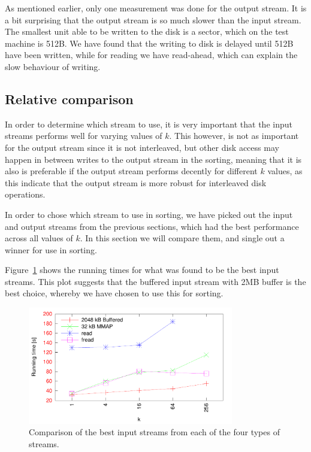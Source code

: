 \documentclass[a4paper,12pt]{article}
\begin{document}
As mentioned earlier, only one measurement was done for the output
stream. It is a bit surprising that the output stream is so much
slower than the input stream. The smallest unit able to be written to
the disk is a sector, which on the test machine is 512B.  We have
found that the writing to disk is delayed until 512B have been
written, while for reading we have read-ahead, which can explain the
slow behaviour of writing.

\subsection{Relative comparison}
In order to determine which stream to use, it is very important that
the input streams performs well for varying values of $k$. This
however, is not as important for the output stream since it is not
interleaved, but other disk access may happen in between writes to the
output stream in the sorting, meaning that it is also is preferable if
the output stream performs decently for different $k$ values, as this
indicate that the output stream is more robust for interleaved disk
operations.

In order to chose which stream to use in sorting, we have picked out
the input and output streams from the previous sections, which had the
best performance across all values of $k$. In this section we will
compare them, and single out a winner for use in sorting.

Figure~\ref{fig:best-input} shows the running times for what was found
to be the best input streams. This plot suggests that the buffered
input stream with 2MB buffer is the best choice, whereby we have
chosen to use this for sorting.

\begin{figure}[h!]
  \centering
  \includegraphics[width=0.8\textwidth]{best_input}
  \caption{Comparison of the best input streams from each of the four
    types of streams.}
  \label{fig:best-input}
\end{figure}
\end{document}
